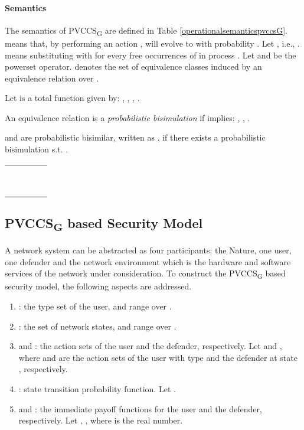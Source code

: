 \documentclass[10pt, conference, compsocconf]{IEEEtran}
\begin{document}
\paragraph{Semantics}
The semantics of PVCCS\textsubscript{G} are defined in Table \ref{operationalsemanticspvccsG}.  means that, by performing an action ,  will evolve to  with probability .
Let , i.e., .  means substituting with  for every free occurrences of  in process .
Let  and  be the powerset operator.
 denotes the set of equivalence classes induced by an equivalence relation  over .
\begin{definition}
Let  is a total function given by: , , , . \end{definition}

\begin{definition}
An equivalence relation  is a \textit{probabilistic bisimulation} if  implies: , , .
\end{definition}

 and  are probabilistic bisimilar, written as , if there exists a probabilistic bisimulation  s.t. .
\begin{table*}
\centering
\renewcommand{\arraystretch}{1.5}
\caption{\label{operationalsemanticspvccsG}Operational semantics of PVCCS\textsubscript{G}}
\begin{tabular}{ll}\hline
&
\\
& \\
&
 ~~~~~
\\
 & \\
 & \\
\hline
\end{tabular}
\end{table*}
\subsection{PVCCS\textsubscript{G} based Security Model}
A network system can be abstracted as four participants: the Nature, one user, one defender and the network environment which is the hardware and software services of the network under consideration.
To construct the PVCCS\textsubscript{G} based security model, the following aspects are addressed.
\begin{enumerate}[1]
\item : the type set of the user, and  range over .
\item  : the set of network states, and  range over .
\item  and : the action sets of the user and the defender, respectively. Let  and , where  and  are the action sets of the user with type  and the defender at state , respectively.
\item : state transition probability function. Let .
\item  and : the immediate payoff functions for the user and the defender, respectively. Let , , where  is the real number.
\end{enumerate}
\end{document}
